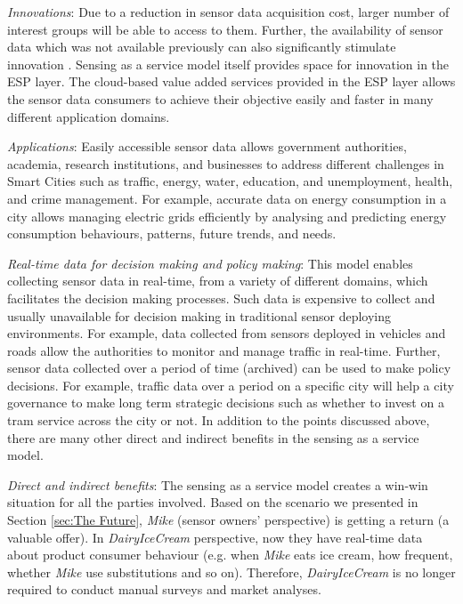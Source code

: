 \documentclass[times]{ettauth}
\newenvironment{noindlist}
 {\begin{list}{\labelitemi}{\leftmargin=1.2em \itemindent=-.5em}}
 {\end{list}}
\begin{document}
\begin{noindlist}
\item  \textit{Innovations}: Due to a reduction in sensor data acquisition cost, larger number of interest groups will be able to access to them. Further, the availability of sensor data which was not available previously can also significantly stimulate innovation . Sensing as a service model itself provides space for innovation in the ESP layer. The cloud-based value added services provided in the ESP layer allows the sensor data consumers to achieve their objective easily and faster in many different application domains. 



\item  \textit{Applications}: Easily accessible sensor data allows government authorities, academia, research institutions, and businesses to address different challenges in Smart Cities such as traffic, energy, water, education, and unemployment, health, and crime management. For example, accurate data on energy consumption in a city allows managing electric grids efficiently by analysing and predicting energy consumption behaviours, patterns, future trends, and needs.


\item  \textit{Real-time data for decision making and policy making}: This model enables collecting sensor data in real-time, from a variety of different domains, which facilitates the decision making processes. Such data is expensive to collect and usually unavailable for decision making in traditional sensor deploying environments. For example, data collected from sensors deployed in vehicles and roads allow the authorities to monitor and manage traffic in real-time. Further, sensor data collected over a period of time (archived) can be used to make policy decisions. For example, traffic data over a period on a specific city will help a city governance to make long term strategic decisions such as whether to invest on a tram service across the city or not. In addition to the points discussed above, there are many other direct and indirect benefits in the sensing as a service model.


\item  \textit{Direct and indirect benefits}: The sensing as a service model creates a win-win situation for all the parties involved. Based on the scenario we presented in Section \ref{sec:The Future}, \textit{Mike} (sensor owners' perspective) is getting a return (a valuable offer). In \textit{DairyIceCream}  perspective, now they have real-time data about product consumer behaviour (e.g. when \textit{Mike} eats ice cream, how frequent, whether \textit{Mike} use substitutions and so on). Therefore, \textit{DairyIceCream} is no longer required to conduct manual surveys and market analyses. 




\end{noindlist}
\end{document}
